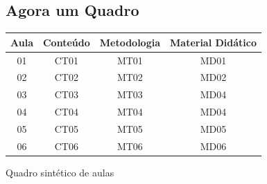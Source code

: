 \subsection{Agora um Quadro}
\begin{quadro}[h]
    \centering
        \begin{tabular}{|c|c|c|c|}
            \hline 
            Aula & Conteúdo & Metodologia & Material Didático \\ 
            \hline 
            01 & CT01 & MT01 & MD01 \\ 
            \hline 
            02 & CT02 & MT02 & MD02 \\ 
            \hline 
            03 & CT03 & MT03 & MD04 \\ 
            \hline 
            04 & CT04 & MT04 & MD04 \\ 
            \hline 
            05 & CT05 & MT05 & MD05 \\ 
            \hline 
            06 & CT06 & MT06 & MD06 \\ 
            \hline 
        \end{tabular} 
        \caption{Quadro sintético de aulas}
        \label{qua:01}
    \end{quadro}
